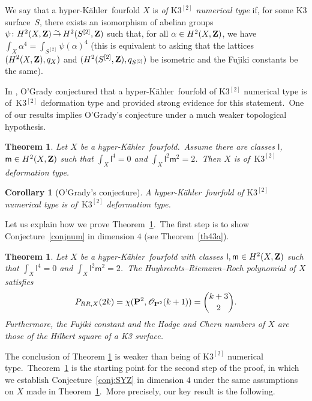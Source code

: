 \documentclass[12pt]{amsart}
\def\cO{\mathscr{O}}
\def\Z{{\bf Z}}
\def\P{{\bf P}}
\DeclareMathOperator{\isomto}{\stackrel{{}_{\scriptstyle\sim}}{\to}}
\def\hk{hyper-K\"ahler}
\newtheorem{theo}[lemm]{Theorem}
\newtheorem{coro}[lemm]{Corollary}
\theoremstyle{remark}
\def\lll{\ensuremath{\mathsf l}}
\def\mm{\ensuremath{\mathsf m}}
\begin{document}
We say that a \hk\ fourfold $X$ is \emph{of $\mathrm{K3}^{[2]}$ numerical type} if, for some K3 surface~$S$, there exists an isomorphism of abelian groups $\psi\colon H^2(X,\Z)\isomto H^2(S^{[2]},\Z)$ such that, for all $\alpha\in H^2(X,\Z)$, we have $\int_X \alpha^4 = \int_{S^{[2]}} \psi(\alpha)^4$ (this is equivalent to asking that the lattices $(H^2(X,\Z),q_X) $ and $(H^2(S^{[2]},\Z),q_{S^{[2]}}) $ be isometric and the Fujiki constants be the same).\

In \cite{og1}, O'Grady  conjectured  that a \hk\ fourfold   of  K3$^{[2]}$ numerical type is of~K3$^{[2]}$ deformation type and provided strong evidence for this statement.\
One of our results implies O'Grady's conjecture under a much weaker  topological  hypothesis.

\begin{theo}\label{thm:MainThm}
Let $X$ be a \hk\ fourfold.\
Assume there are classes $\lll$, $\mm\in H^2(X,{\Z})$ such that $\int_X \lll^4=0$ and $\int_X\lll^2\mm^2=2$.\
Then $X$ is of~$\mathrm{K3}^{[2]}$ deformation type.
\end{theo}

\begin{coro}[O'Grady's conjecture]\label{cor:OGrady}
A \hk\ fourfold   of  $\mathrm{K3}^{[2]}$ numerical type  is of~$\mathrm{K3}^{[2]}$ deformation type.
\end{coro}

Let us explain  how we prove Theorem~\ref{thm:MainThm}.\
The first step   is to show Conjecture~\ref{conjnum} in dimension $4$ (see Theorem~\ref{th43a}). 

\begin{theo}\label{thm:RRpoly}
Let $X$ be a \hk\ fourfold with classes $\lll,\mm\in H^2(X,\Z)$ such that $\int_X \lll^4=0$ and $\int_X\lll^2\mm^2=2$.\
The Huybrechts--Riemann--Roch polynomial of $X$ satisfies
\[
P_{RR,X}(2k)=\chi(\P^2,\cO_{\P^2}(k+1))=\binom{k+3}{2}.
\]
Furthermore, the Fujiki constant and the Hodge and Chern numbers of $X$ are those of the Hilbert square of a K3 surface.
\end{theo}

The conclusion  of Theorem \ref{thm:RRpoly} is  weaker than being of ${\mathrm K3}^{[2]}$ numerical type.\
Theorem~\ref{thm:RRpoly} is the starting point for the  second step of the proof, in which we establish
 Conjecture~\ref{conj:SYZ} in dimension $4$  under the same  assumptions on $X$ made in Theorem~\ref{thm:MainThm}.\
More precisely, our key result is the following.
\end{document}
